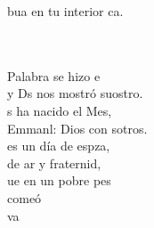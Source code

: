 \documentclass[12pt]{article}
\begin{document}
\begin{multicols*}{2}
\begin{cancion}
	bua en tu interior  ca.\\\jump\\
	\begin{chorus}%
	    \\
	 Palabra se hizo e\\
	y Ds nos mostró suostro.\\
	s ha nacido el Mes,\\
	Emmanl: Dios con sotros.\\
	es un día de espza,\\
	de ar y fraternid,\\
	ue en un pobre pes\\
	comeó   \\
	 va     \\
	\end{chorus}%
	\jump\\
\end{cancion}%


\end{multicols*}
\end{document}
